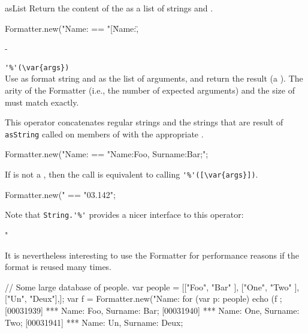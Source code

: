 \begin{urbiscriptapi}
\item[asList]
  Return the content of the  as a list of strings and
  .
\begin{urbiassert}
Formatter.new("Name:%
       == "[\"Name:\", %
\end{urbiassert}

-\item \lstinline|'%'(\var{args})|\\
  Use \this as format string and  as the list of
  arguments, and return the result (a ).  The arity
  of the Formatter (i.e., the number of expected arguments) and the
  size of  must match exactly.

  This operator concatenates regular strings and the strings that are
  result of \lstinline|asString| called on members of  with
  the appropriate .
\begin{urbiassert}
Formatter.new("Name:%
       == "Name:Foo, Surname:Bar;";
\end{urbiassert}

  If  is not a , then the call is equivalent
  to calling \lstinline|'%'([\var{args}])|.
\begin{urbiassert}
Formatter.new("%
       == "03.142";
\end{urbiassert}

  Note that \lstinline|String.'%'| provides a nicer interface to this
  operator:
\begin{urbiassert}
"%
\end{urbiassert}

  It is nevertheless interesting to use the Formatter for performance
  reasons if the format is reused many times.
\begin{urbiscript}
{
  // Some large database of people.
  var people =
    [["Foo", "Bar" ],
     ["One", "Two" ],
     ["Un",  "Deux"],];
  var f = Formatter.new("Name:%
  for (var p: people)
    echo (f %
};
[00031939] *** Name:    Foo, Surname:    Bar;
[00031940] *** Name:    One, Surname:    Two;
[00031941] *** Name:     Un, Surname:   Deux;
\end{urbiscript}
\end{urbiscriptapi}

